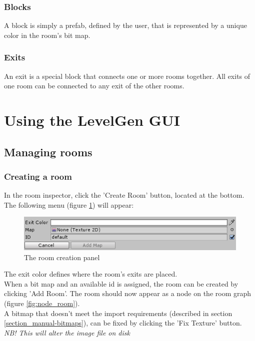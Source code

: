 \documentclass[a4paper]{article}
\begin{document}
	\subsubsection{Blocks}
	A block is simply a prefab, defined by the user, that is represented by a unique color in the room's bit map.
	\subsubsection{Exits}
	An exit is a special block that connects one or more rooms together. All exits of one room can be connected to any exit of the other rooms.
	
	\newpage
	
	\section{Using the LevelGen GUI}
	\subsection{Managing rooms}
	\subsubsection{Creating a room}
	In the room inspector, click the 'Create Room' button, located at the bottom. The following menu (figure \ref{fig:create_room}) will appear:
	
	\begin{figure}[h]
		\includegraphics[width=\linewidth]{img/Menu_CreateRoom.PNG}
		\caption{The room creation panel}
		\label{fig:create_room}
	\end{figure}

	The exit color defines where the room's exits are placed. 
	\\When a bit map and an available id is assigned, the room can be created by clicking 'Add Room'. The room should now appear as a node on the room graph (figure \ref{fig:node_room}). \\
	A bitmap that doesn't meet the import requirements (described in section \ref{section_manual-bitmaps}), can be fixed by clicking the 'Fix Texture' button. \textit{NB! This will alter the image file on disk} \\
	
\end{document}
